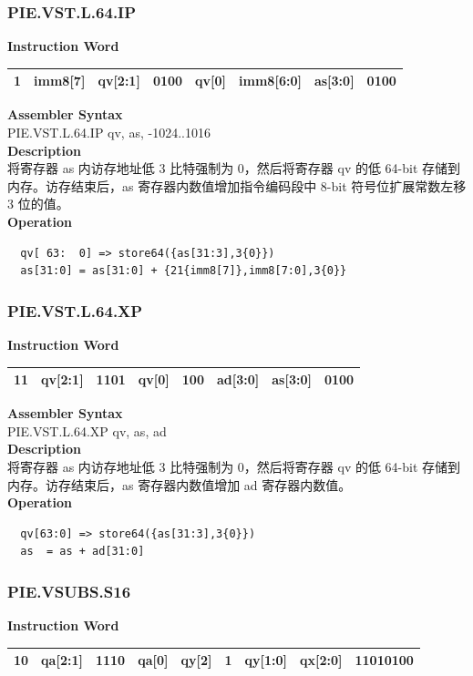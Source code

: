 \newpage
\subsubsection{PIE.VST.L.64.IP}\label{instruction:PIEVSTL64IP}
\setlength\tabcolsep{6pt}
\textbf{Instruction Word} \\
\begin{tabular}{|c|c|c|c|c|c|c|c|}
	\hline
	1 & imm8[7] & qv[2:1] & 0100 & qv[0] & imm8[6:0] & as[3:0] & 0100 \\
	\hline
\end{tabular}

\textbf{Assembler Syntax} \\
PIE.VST.L.64.IP qv, as, -1024..1016 \\
\textbf{Description} \\
将寄存器 as 内访存地址低 3 比特强制为 0，然后将寄存器 qv 的低 64-bit 存储到内存。访存结束后，as 寄存器内数值增加指令编码段中 8-bit 符号位扩展常数左移 3 位的值。\\
\textbf{Operation}
\begin{lstlisting}
  qv[ 63:  0] => store64({as[31:3],3{0}})
  as[31:0] = as[31:0] + {21{imm8[7]},imm8[7:0],3{0}}
\end{lstlisting}

\newpage
\subsubsection{PIE.VST.L.64.XP}\label{instruction:PIEVSTL64XP}
\setlength\tabcolsep{6pt}
\textbf{Instruction Word} \\
\begin{tabular}{|c|c|c|c|c|c|c|c|}
	\hline
	11 & qv[2:1] & 1101 & qv[0] & 100 & ad[3:0] & as[3:0] & 0100 \\
	\hline
\end{tabular}

\textbf{Assembler Syntax} \\
PIE.VST.L.64.XP qv, as, ad \\
\textbf{Description} \\
将寄存器 as 内访存地址低 3 比特强制为 0，然后将寄存器 qv 的低 64-bit 存储到内存。访存结束后，as 寄存器内数值增加 ad 寄存器内数值。\\
\textbf{Operation}
\begin{lstlisting}
  qv[63:0] => store64({as[31:3],3{0}})
  as  = as + ad[31:0]
\end{lstlisting}

\newpage
\subsubsection{PIE.VSUBS.S16}\label{instruction:PIEVSUBSS16}
\setlength\tabcolsep{6pt}
\textbf{Instruction Word} \\
\begin{tabular}{|c|c|c|c|c|c|c|c|c|}
	\hline
	10 & qa[2:1] & 1110 & qa[0] & qy[2] & 1 & qy[1:0] & qx[2:0] & 11010100 \\
	\hline
\end{tabular}

